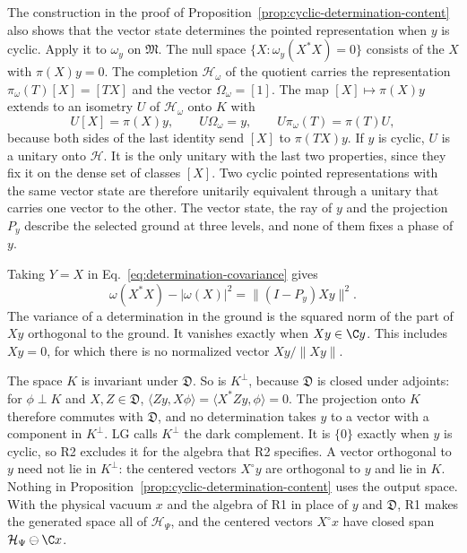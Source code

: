 The construction in the proof of Proposition~\ref{prop:cyclic-determination-content} also shows that the vector state determines the pointed representation when $y$ is cyclic. Apply it to $\omega_y$ on $\mathfrak M$. The null space $\{X:\omega_y(X^*X)=0\}$ consists of the $X$ with $\pi(X)y=0$. The completion $\mathcal H_\omega$ of the quotient carries the representation $\pi_\omega(T)[X]=[TX]$ and the vector $\Omega_\omega=[1]$. The map $[X]\mapsto\pi(X)y$ extends to an isometry $U$ of $\mathcal H_\omega$ onto $K$ with
\begin{equation}
 U[X]=\pi(X)y,\qquad U\Omega_\omega=y,\qquad U\pi_\omega(T)=\pi(T)U ,
 \label{eq:gns-intertwiner}
\end{equation}
because both sides of the last identity send $[X]$ to $\pi(TX)y$. If $y$ is cyclic, $U$ is a unitary onto $\mathcal H$. It is the only unitary with the last two properties, since they fix it on the dense set of classes $[X]$. Two cyclic pointed representations with the same vector state are therefore unitarily equivalent through a unitary that carries one vector to the other. The vector state, the ray of $y$ and the projection $P_y$ describe the selected ground at three levels, and none of them fixes a phase of $y$.

Taking $Y=X$ in Eq.~\eqref{eq:determination-covariance} gives
\begin{equation}
 \omega(X^*X)-|\omega(X)|^2=\bigl\|(I-P_y)Xy\bigr\|^2 .
 \label{eq:determination-variance}
\end{equation}
The variance of a determination in the ground is the squared norm of the part of $Xy$ orthogonal to the ground. It vanishes exactly when $Xy\in\C y$. This includes $Xy=0$, for which there is no normalized vector $Xy/\|Xy\|$.

The space $K$ is invariant under $\mathfrak D$. So is $K^\perp$, because $\mathfrak D$ is closed under adjoints: for $\phi\perp K$ and $X,Z\in\mathfrak D$, $\langle Zy,X\phi\rangle=\langle X^*Zy,\phi\rangle=0$. The projection onto $K$ therefore commutes with $\mathfrak D$, and no determination takes $y$ to a vector with a component in $K^\perp$. LG calls $K^\perp$ the dark complement. It is $\{0\}$ exactly when $y$ is cyclic, so R2 excludes it for the algebra that R2 specifies. A vector orthogonal to $y$ need not lie in $K^\perp$: the centered vectors $X^\circ y$ are orthogonal to $y$ and lie in $K$. Nothing in Proposition~\ref{prop:cyclic-determination-content} uses the output space. With the physical vacuum $x$ and the algebra of R1 in place of $y$ and $\mathfrak D$, R1 makes the generated space all of $\mathcal H_\Psi$, and the centered vectors $X^\circ x$ have closed span $\mathcal H_\Psi\ominus\C x$.

